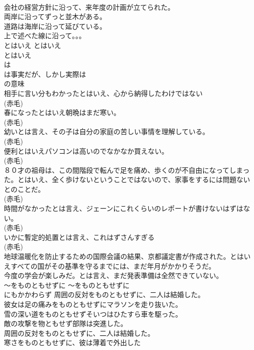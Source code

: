 \documentclass[8pt]{extreport}
\begin{document}
\begin{CJK}{UTF8}{min}
\\	会社の経営方針に沿って、来年度の計画が立てられた。  
\\	両岸に沿ってずっと並木がある。   
\\	道路は海岸に沿って延びている。   
\\	上で述べた線に沿って。。。   
\\	とはいえ	とはいえ	
\\	とはいえ 
\\	は
\\	は事実だが、しかし実際は
\\	の意味	
\\	相手に言い分もわかったとはいえ、心から納得したわけではない  
\\	(赤毛)
\\	春になったとはいえ朝晩はまだ寒い。  
\\	(赤毛)
\\	幼いとは言え、その子は自分の家庭の苦しい事情を理解している。  
\\	(赤毛)
\\	便利とはいえパソコンは高いのでなかなか買えない。  
\\	(赤毛)
\\	８０才の祖母は、この間階段で転んで足を痛め、歩くのが不自由になってしまった。とはいえ、全く歩けないということではないので、家事をするには問題ないとのことだ。  
\\	(赤毛)
\\	時間がなかったとは言え、ジェーンにこれくらいのレポートが書けないはずはない。  
\\	(赤毛)
\\	いかに暫定的処置とは言え、これはずさんすぎる  
\\	(赤毛)
\\	地球温暖化を防止するための国際会議の結果、京都議定書が作成された。とはいえすべての国がその基準を守るまでには、まだ年月がかかりそうだ。  
\\	今度の学会が楽しみだ。とは言え、まだ発表準備は全然できていない。  
\\	〜をものともせずに	〜をものともせずに	
\\	にもかかわらず	周囲の反対をものともせずに、二人は結婚した。	
\\	彼女は足の痛みをものともせずにマラソンを走り抜いた。  
\\	雪の深い道をものともせずそいつはひたすら車を駆った。  
\\	敵の攻撃を物ともせず部隊は突進した。  
\\	周囲の反対をものともせずに、二人は結婚した。  
\\	寒さをものともせずに、彼は薄着で外出した   

\end{CJK}
\end{document}
